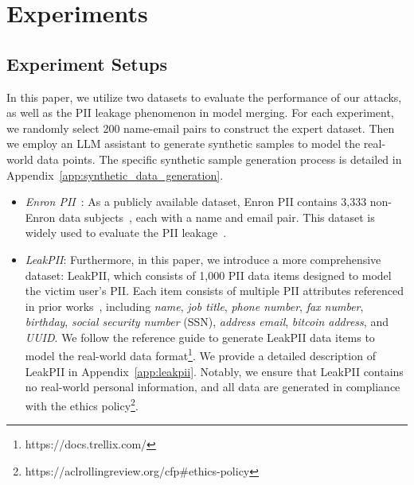 \section{Experiments}

\subsection{Experiment Setups}



In this paper, we utilize two datasets to evaluate the performance of our attacks, as well as the PII leakage phenomenon in model merging. For each experiment, we randomly select 200 name-email pairs to construct the expert dataset. Then we employ an LLM assistant to generate synthetic samples to model the real-world data points. The specific synthetic sample generation process is detailed in Appendix~\ref{app:synthetic_data_generation}.
\begin{itemize}[itemsep=3pt, leftmargin=*, topsep=5pt]
    \item \textit{Enron PII}~\cite{klimt2004enron}: As a publicly available dataset, Enron PII contains 3,333 non-Enron data subjects~\cite{huang2022large}, each with a name and email pair. This dataset is widely used to evaluate the PII leakage~\cite{lukas2023analyzing, nakka2024pii}. 

    \item \textit{LeakPII}: Furthermore, in this paper, we introduce a more comprehensive dataset: LeakPII, which consists of 1,000 PII data items designed to model the victim user's PII. Each item consists of multiple PII attributes referenced in prior works~\cite{nasr2023scalable, carlini2021extracting}, including \textit{name}, \textit{job title}, \textit{phone number}, \textit{fax number}, \textit{birthday}, \textit{social security number} (SSN), \textit{address email}, \textit{bitcoin address}, and \textit{UUID}. We follow the reference guide to generate LeakPII data items to model the real-world data format\footnote{https://docs.trellix.com/}. We provide a detailed description of LeakPII in Appendix~\ref{app:leakpii}. Notably, we ensure that LeakPII contains no real-world personal information, and all data are generated in compliance with the ethics policy\footnote{https://aclrollingreview.org/cfp\#ethics-policy}.
\end{itemize}



